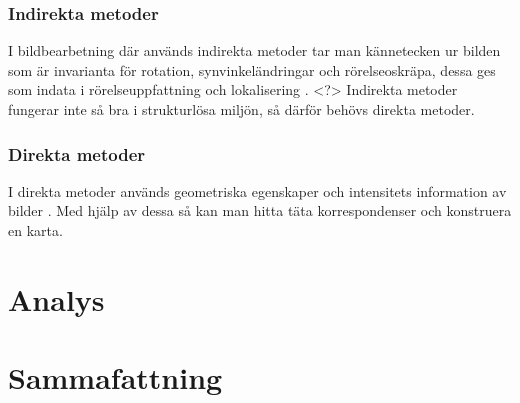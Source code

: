 \subsection{Indirekta metoder}

I bildbearbetning där används indirekta metoder tar man kännetecken ur bilden som är invarianta för rotation, synvinkeländringar och rörelseoskräpa, dessa ges som indata i rörelseuppfattning och lokalisering \citep{geospatial}. <?> Indirekta metoder fungerar inte så bra i strukturlösa miljön, så därför behövs direkta metoder. 

\subsection{Direkta metoder}

I direkta metoder används geometriska egenskaper och intensitets information av bilder \citep{geospatial}. Med hjälp av dessa så kan man hitta täta korrespondenser och konstruera en karta. 

\chapter{Analys}

\chapter{Sammafattning}

\iffalse
Mäst är inomhus av drönaren
Problem med beräkning, pga batteri kapacitet och komplexa algoritmer och bildbearbetningsalgoritmer
\fi

